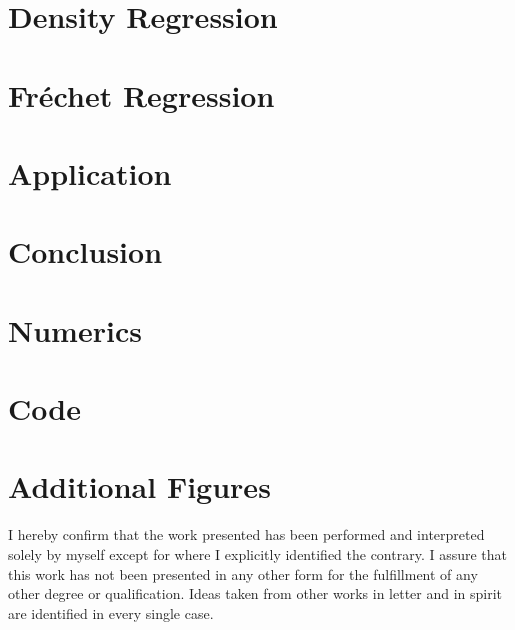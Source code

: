 \documentclass[12pt, a4paper, bibtotoc]{scrartcl}
\theoremstyle{break}
\begin{document}
\section{Density Regression}
\label{sec:density regression}


\section{Fréchet Regression}
\label{sec:fréchet regression}


\section{Application}
\label{sec:application}


\clearpage  %
\newpage
\section{Conclusion}
\label{sec:conclusion}




\clearpage  %
\newpage

\nocite{Gaudecker2019}
\printbibliography


\newpage
\appendix
{}

\section{Numerics}
\label{sec:numerics}


\clearpage  %
\newpage
\section{Code}
\label{sec:code}


\clearpage  %
\newpage
\section{Additional Figures}
\label{sec:figures}



\newpage
\thispagestyle{empty}  %
\null\vfill            %
\begin{center}
I hereby confirm that the work presented has been performed and interpreted solely by
myself except for where I explicitly identified the contrary. I assure that this work has
not been presented in any other form for the fulfillment of any other degree or
qualification. Ideas taken from other works in letter and in spirit are identified
in every single case.
\end{center}
\end{document}
